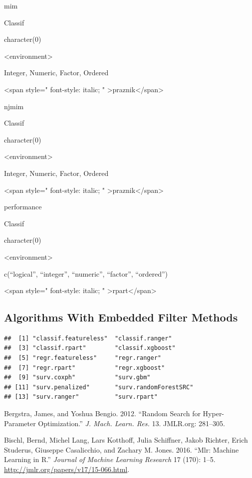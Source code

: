 \documentclass[12pt,]{scrbook}
\begin{document}
mim

Classif

character(0)

\textless{}environment\textgreater{}

Integer, Numeric, Factor, Ordered

\textless{}span style=" font-style: italic; " \textgreater{}praznik\textless{}/span\textgreater{}

njmim

Classif

character(0)

\textless{}environment\textgreater{}

Integer, Numeric, Factor, Ordered

\textless{}span style=" font-style: italic; " \textgreater{}praznik\textless{}/span\textgreater{}

performance

Classif

character(0)

\textless{}environment\textgreater{}

c(``logical'', ``integer'', ``numeric'', ``factor'', ``ordered'')

\textless{}span style=" font-style: italic; " \textgreater{}rpart\textless{}/span\textgreater{}

\hypertarget{fs-filter-embedded-list}{%
\subsection{Algorithms With Embedded Filter Methods}\label{fs-filter-embedded-list}}

\begin{verbatim}
##  [1] "classif.featureless"  "classif.ranger"      
##  [3] "classif.rpart"        "classif.xgboost"     
##  [5] "regr.featureless"     "regr.ranger"         
##  [7] "regr.rpart"           "regr.xgboost"        
##  [9] "surv.coxph"           "surv.gbm"            
## [11] "surv.penalized"       "surv.randomForestSRC"
## [13] "surv.ranger"          "surv.rpart"
\end{verbatim}

\hypertarget{refs}{}
\leavevmode\hypertarget{ref-bergstra2012}{}%
Bergstra, James, and Yoshua Bengio. 2012. ``Random Search for Hyper-Parameter Optimization.'' \emph{J. Mach. Learn. Res.} 13. JMLR.org: 281--305.

\leavevmode\hypertarget{ref-mlr}{}%
Bischl, Bernd, Michel Lang, Lars Kotthoff, Julia Schiffner, Jakob Richter, Erich Studerus, Giuseppe Casalicchio, and Zachary M. Jones. 2016. ``Mlr: Machine Learning in R.'' \emph{Journal of Machine Learning Research} 17 (170): 1--5. \url{http://jmlr.org/papers/v17/15-066.html}.
\end{document}

